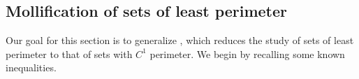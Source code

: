 \documentclass[reqno,12pt,letterpaper]{amsart}
\newcommand*\dif{\mathop{}\!\mathrm{d}}
\newtheorem{sublemma}[theorem]{Sublemma}
\theoremstyle{definition}
\numberwithin{equation}{section}
\begin{document}


\subsection{Mollification of sets of least perimeter}
Our goal for this section is to generalize \cite[Lemma 7.5]{Giusti77}, which reduces the study of sets of least perimeter to that of sets with $C^1$ perimeter.
We begin by recalling some known inequalities.
\end{document}
